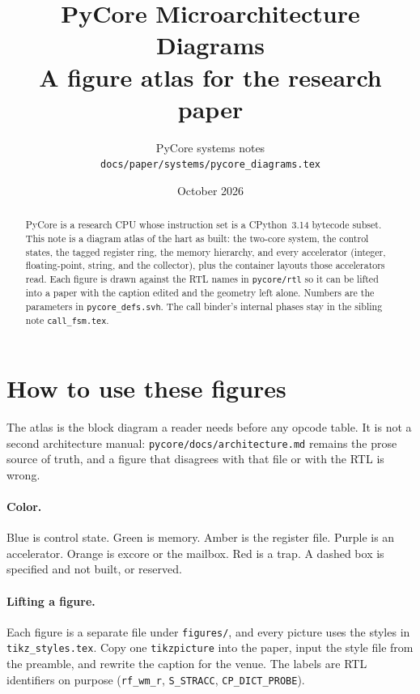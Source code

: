 \documentclass[11pt,a4paper]{article}
\title{PyCore Microarchitecture Diagrams\\
\large A figure atlas for the research paper}
\author{PyCore systems notes\\
\texttt{docs/paper/systems/pycore\_diagrams.tex}}
\date{October 2026}
\begin{document}
\maketitle

\begin{abstract}
PyCore is a research CPU whose instruction set is a CPython~3.14 bytecode subset.
This note is a diagram atlas of the hart as built: the two-core system, the control
states, the tagged register ring, the memory hierarchy, and every accelerator
(integer, floating-point, string, and the collector), plus the container layouts
those accelerators read.
Each figure is drawn against the RTL names in \texttt{pycore/rtl} so it can be
lifted into a paper with the caption edited and the geometry left alone.
Numbers are the parameters in \texttt{pycore\_defs.svh}.
The call binder's internal phases stay in the sibling note \texttt{call\_fsm.tex}.
\end{abstract}

\tableofcontents
\listoffigures
\newpage

\section{How to use these figures}
\label{sec:how}

The atlas is the block diagram a reader needs before any opcode table.
It is not a second architecture manual: \texttt{pycore/docs/architecture.md}
remains the prose source of truth, and a figure that disagrees with that file
or with the RTL is wrong.

\paragraph{Color.}
Blue is control state.
Green is memory.
Amber is the register file.
Purple is an accelerator.
Orange is excore or the mailbox.
Red is a trap.
A dashed box is specified and not built, or reserved.

\paragraph{Lifting a figure.}
Each figure is a separate file under \texttt{figures/}, and every picture
uses the styles in \texttt{tikz\_styles.tex}.
Copy one \texttt{tikzpicture} into the paper, input the style file from the
preamble, and rewrite the caption for the venue.
The labels are RTL identifiers on purpose (\texttt{rf\_wm\_r},
\texttt{S\_STRACC}, \texttt{CP\_DICT\_PROBE}).
\end{document}
